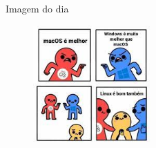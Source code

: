 \documentclass{beamer}
\begin{document}
\begin{frame}[fragile]{Imagem do dia}

    \begin{figure}[H]
        \centerline{\includegraphics[width=0.4\textwidth]{assets/imagem-do-dia/sope-02.jpeg}}

    \end{figure}
\end{frame}

\backmatter
\end{document}
